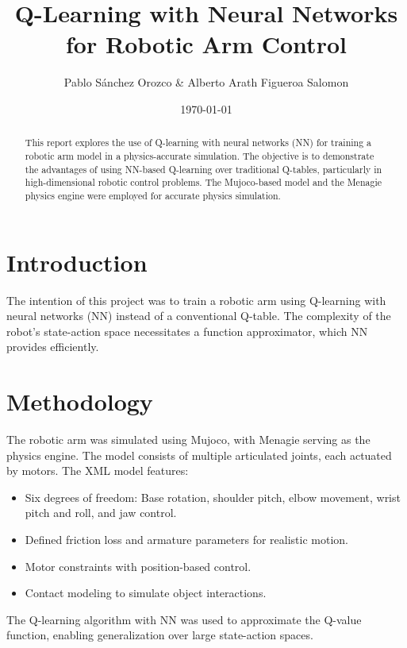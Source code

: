 \documentclass{article}
\title{Q-Learning with Neural Networks for Robotic Arm Control}
\author{Pablo Sánchez Orozco & Alberto Arath Figueroa Salomon}
\date{\today}
\begin{document}
\maketitle

\begin{abstract}
This report explores the use of Q-learning with neural networks (NN) for training a robotic arm model in a physics-accurate simulation. The objective is to demonstrate the advantages of using NN-based Q-learning over traditional Q-tables, particularly in high-dimensional robotic control problems. The Mujoco-based model and the Menagie physics engine were employed for accurate physics simulation.
\end{abstract}

\section{Introduction}
The intention of this project was to train a robotic arm using Q-learning with neural networks (NN) instead of a conventional Q-table. The complexity of the robot's state-action space necessitates a function approximator, which NN provides efficiently. 

\section{Methodology}
The robotic arm was simulated using Mujoco, with Menagie serving as the physics engine. The model consists of multiple articulated joints, each actuated by motors. The XML model features:
\begin{itemize}
    \item Six degrees of freedom: Base rotation, shoulder pitch, elbow movement, wrist pitch and roll, and jaw control.
    \item Defined friction loss and armature parameters for realistic motion.
    \item Motor constraints with position-based control.
    \item Contact modeling to simulate object interactions.
\end{itemize}

The Q-learning algorithm with NN was used to approximate the Q-value function, enabling generalization over large state-action spaces.
\end{document}
